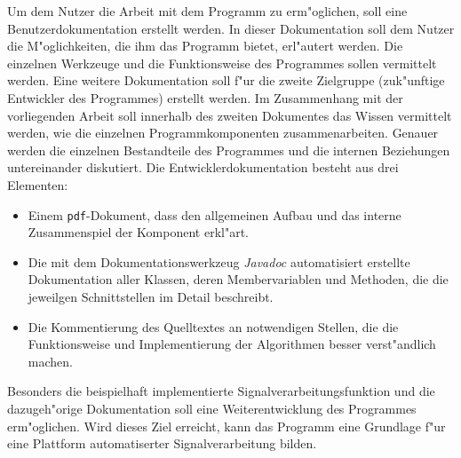 Um dem Nutzer die Arbeit mit dem Programm zu erm"oglichen, soll eine Benutzerdokumentation erstellt werden.
In dieser Dokumentation soll dem Nutzer die M"oglichkeiten, die ihm das Programm bietet, erl"autert werden.
Die einzelnen Werkzeuge und die Funktionsweise des Programmes sollen vermittelt werden.
Eine weitere Dokumentation soll f"ur die zweite Zielgruppe (zuk"unftige Entwickler des Programmes) erstellt werden.
Im Zusammenhang mit der vorliegenden Arbeit soll innerhalb des zweiten Dokumentes das Wissen vermittelt werden, wie die einzelnen Programmkomponenten zusammenarbeiten.
Genauer werden die einzelnen Bestandteile des Programmes und die internen Beziehungen untereinander diskutiert.
Die Entwicklerdokumentation besteht aus drei Elementen:
\begin{itemize}
	\item Einem \verb|pdf|-Dokument, dass den allgemeinen Aufbau und das interne Zusammenspiel der Komponent erkl"art.
	\item Die mit dem Dokumentationswerkzeug \emph{Javadoc} automatisiert erstellte Dokumentation aller Klassen, deren Membervariablen und Methoden, die die jeweilgen Schnittstellen im Detail beschreibt.
	\item Die Kommentierung des Quelltextes an notwendigen Stellen, die die Funktionsweise und Implementierung der Algorithmen besser verst"andlich machen.
\end{itemize}
Besonders die beispielhaft implementierte Signalverarbeitungsfunktion und die dazugeh"orige Dokumentation soll eine Weiterentwicklung des Programmes erm"oglichen.
Wird dieses Ziel erreicht, kann das Programm eine Grundlage f"ur eine Plattform automatiserter Signalverarbeitung bilden.

